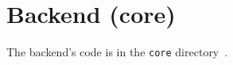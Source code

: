 \section{Backend (core)}\label{sec:backend-core}

The backend's code is in the \texttt{core} directory~\cite{sewera_notipie_2022}.



